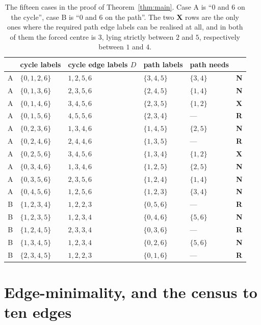 \documentclass[11pt]{amsart}
\theoremstyle{remark}
\begin{document}
\begin{table}[htbp]
\renewcommand{\arraystretch}{1.08}
\begin{tabular}{clllll}
\hline
 & cycle labels & cycle edge labels $D$ & path labels & path needs & \\
\hline
A & $\{0,1,2,6\}$ & $1,2,5,6$ & $\{3,4,5\}$ & $\{3,4\}$ & \textbf{N}\\
A & $\{0,1,3,6\}$ & $2,3,5,6$ & $\{2,4,5\}$ & $\{1,4\}$ & \textbf{N}\\
A & $\{0,1,4,6\}$ & $3,4,5,6$ & $\{2,3,5\}$ & $\{1,2\}$ & \textbf{X}\\
A & $\{0,1,5,6\}$ & $4,5,5,6$ & $\{2,3,4\}$ & --- & \textbf{R}\\
A & $\{0,2,3,6\}$ & $1,3,4,6$ & $\{1,4,5\}$ & $\{2,5\}$ & \textbf{N}\\
A & $\{0,2,4,6\}$ & $2,4,4,6$ & $\{1,3,5\}$ & --- & \textbf{R}\\
A & $\{0,2,5,6\}$ & $3,4,5,6$ & $\{1,3,4\}$ & $\{1,2\}$ & \textbf{X}\\
A & $\{0,3,4,6\}$ & $1,3,4,6$ & $\{1,2,5\}$ & $\{2,5\}$ & \textbf{N}\\
A & $\{0,3,5,6\}$ & $2,3,5,6$ & $\{1,2,4\}$ & $\{1,4\}$ & \textbf{N}\\
A & $\{0,4,5,6\}$ & $1,2,5,6$ & $\{1,2,3\}$ & $\{3,4\}$ & \textbf{N}\\
B & $\{1,2,3,4\}$ & $1,2,2,3$ & $\{0,5,6\}$ & --- & \textbf{R}\\
B & $\{1,2,3,5\}$ & $1,2,3,4$ & $\{0,4,6\}$ & $\{5,6\}$ & \textbf{N}\\
B & $\{1,2,4,5\}$ & $2,3,3,4$ & $\{0,3,6\}$ & --- & \textbf{R}\\
B & $\{1,3,4,5\}$ & $1,2,3,4$ & $\{0,2,6\}$ & $\{5,6\}$ & \textbf{N}\\
B & $\{2,3,4,5\}$ & $1,2,2,3$ & $\{0,1,6\}$ & --- & \textbf{R}\\
\hline
\end{tabular}
\medskip
\caption{The fifteen cases in the proof of Theorem~\ref{thm:main}. Case A is
``$0$ and $6$ on the cycle'', case B is ``$0$ and $6$ on the path''. The two
\textbf{X} rows are the only ones where the required path edge labels can be
realised at all, and in both of them the forced centre is $3$, lying strictly
between $2$ and $5$, respectively between $1$ and $4$.}
\label{tab:cases}
\end{table}

\section{Edge-minimality, and the census to ten edges}
\label{sec:census}
\end{document}
